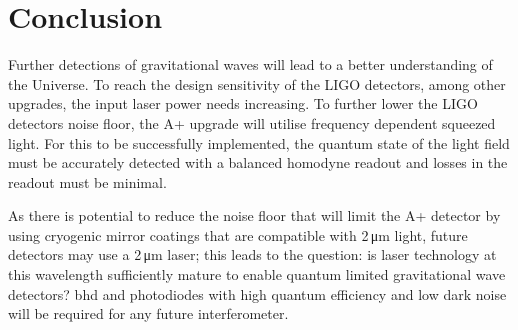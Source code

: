\section{Conclusion}
Further detections of gravitational waves will lead to a better understanding of the Universe. To reach the design sensitivity of the LIGO detectors, among other upgrades, the input laser power needs increasing. To further lower the LIGO detectors noise floor, the A+ upgrade will utilise frequency dependent squeezed light. For this to be successfully implemented, the quantum state of the light field must be accurately detected with a balanced homodyne readout and losses in the readout must be minimal. 
\par
As there is potential to reduce the noise floor that will limit the A+ detector by using cryogenic mirror coatings that are compatible with 2\,\si{\micro\meter} light, future detectors may use a 2\,\si{\micro\meter} laser; this leads to the question: is laser technology at this wavelength sufficiently mature to enable quantum limited gravitational wave detectors? \gls{bhd} and photodiodes with high quantum efficiency and low dark noise will be required for any future interferometer.